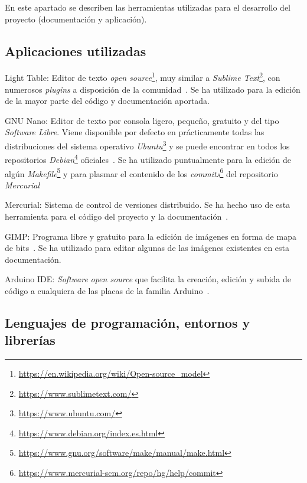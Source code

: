 En este apartado se describen las herramientas utilizadas para el desarrollo del proyecto (documentación y aplicación).

\subsection{Aplicaciones utilizadas}

\begin{definitionlist}
\item[Light Table:] Editor de texto \textit{open source}\footnote{\url{https://en.wikipedia.org/wiki/Open-source_model}}, muy similar a \textit{Sublime Text}\footnote{\url{https://www.sublimetext.com/}}, con numerosos \textit{plugins} a disposición de la comunidad~\cite{Lighttable}. Se ha utilizado para la edición de la mayor parte del código y documentación aportada.
\item[\acs{GNU} Nano:] Editor de texto por consola ligero, pequeño, gratuito y del tipo \textit{Software Libre}. Viene disponible por defecto en prácticamente todas las distribuciones del sistema operativo \textit{Ubuntu}\footnote{\url{https://www.ubuntu.com/}} y se puede encontrar en todos los repositorios \textit{Debian}\footnote{\url{https://www.debian.org/index.es.html}} oficiales~\cite{Nano}. Se ha utilizado puntualmente para la edición de algún \textit{Makefile}\footnote{\url{https://www.gnu.org/software/make/manual/make.html}} y para plasmar el contenido de los \textit{commits}\footnote{\url{https://www.mercurial-scm.org/repo/hg/help/commit}} del repositorio \textit{Mercurial}
\item[Mercurial:] Sistema de control de versiones distribuido. Se ha hecho uso de esta herramienta para el código del proyecto y la documentación~\cite{Mercurial}.
\item[\acs{GIMP}:] Programa libre y gratuito para la edición de imágenes en forma de mapa de bits~\cite{Gimp}. Se ha utilizado para editar algunas de las imágenes existentes en esta documentación.
\item[Arduino \acs{IDE}:] \textit{Software} \textit{open source} que facilita la creación, edición y subida de código a cualquiera de las placas de la familia Arduino~\cite{ArduinoIDE}.

\end{definitionlist}


\subsection{Lenguajes de programación, entornos y librerías}

